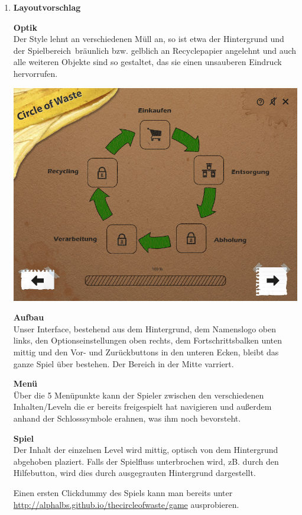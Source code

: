 \documentclass[a4paper]{article}
\newcommand{\TOP}[1]{\item \textbf{#1}\par}
\begin{document}
\begin{enumerate}

\TOP{Layoutvorschlag}

\textbf{Optik}\\
Der Style lehnt an verschiedenen Müll an, so ist etwa der Hintergrund und der \glqq Spielbereich\grqq\ bräunlich bzw. gelblich an Recyclepapier angelehnt und auch alle weiteren Objekte sind so gestaltet, das sie einen unsauberen Eindruck hervorrufen.

\begin{center}
\includegraphics[width=.8\linewidth]{locks.jpg}
\end{center}

\textbf{Aufbau}\\
Unser Interface, bestehend aus dem Hintergrund, dem Namenslogo oben links, den Optionseinstellungen oben rechts, dem Fortschrittsbalken unten mittig und den Vor- und Zurückbuttons in den unteren Ecken, bleibt das ganze Spiel über bestehen. Der Bereich in der Mitte varriert.

\textbf{Menü}\\
Über die 5 Menüpunkte kann der Spieler zwischen den verschiedenen Inhalten/Leveln die er bereits freigespielt hat navigieren und außerdem anhand der Schlosssymbole erahnen, was ihm noch bevorsteht.

\textbf{Spiel}\\
Der Inhalt der einzelnen Level wird mittig, optisch von dem Hintergrund abgehoben plaziert.
Falls der Spielfluss unterbrochen wird, zB. durch den Hilfebutton, wird dies durch ausgegrauten Hintergrund dargestellt.

Einen ersten Clickdummy des Spiels kann man bereits unter \url{http://alphalbs.github.io/thecircleofwaste/game} ausprobieren.


\end{enumerate}
\end{document}
